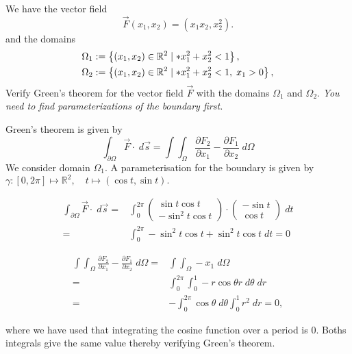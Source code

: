 \documentclass[11pt]{article}
\begin{document}
\begin{exercise}
    We have the vector field 
    \[
        \vec F( x_1, x_2 ) = \left( x_1 x_2, x_2^{2} \right).
    \]
    and the domains 
    \begin{align*}
        \Omega_1 &:= \left\{ (x_1,x_2) \in \bbR^{2} \suchthat* x_1^{2} + x_2^{2} < 1 \right\},
        \\
        \Omega_2 &:= \left\{ (x_1,x_2) \in \bbR^{2} \suchthat* x_1^{2} + x_2^{2} < 1, \; x_1 > 0 \right\},
     \end{align*}
    Verify Green's theorem for the vector field $\vec F$ with the domains $\Omega_1$ and $\Omega_2$. 
    \textit{You need to find parameterizations of the boundary first.}
\end{exercise}
\begin{solution}   
   Green's theorem is given by $$\int_{\partial \Omega} \vec{F} \cdot \;d\vec{s} = \int \int_{\Omega} \frac{\partial F_2}{\partial x_1} - \frac{\partial F_1}{\partial x_2} \;d \Omega$$
We consider domain $\Omega_1$. A parameterisation for the boundary is given by $\gamma: [0,2\pi] \mapsto \mathbb{R}^2, \quad t\mapsto  (\cos t, \sin t).$

\begin{align*}
\int_{\partial \Omega} \vec{F} \cdot \;d\vec{s} =& \int_0^ {2\pi} \begin{pmatrix}\sin t \cos t\\ -\sin^2 t \cos t \end{pmatrix} \cdot \begin{pmatrix}-\sin t \\ \cos t \end{pmatrix} \; d t \\
=& \int_0^{2\pi} -\sin^2 t\cos t + \sin^ 2 t \cos t \;dt = 0
\end{align*}

\begin{align*}
\int \int_{\Omega} \frac{\partial F_2}{\partial x_1} - \frac{\partial F_1}{\partial x_2} \;d \Omega =& \int \int_{\Omega} -x_1 \; d\Omega\\
=& \int_0^ {2\pi} \int_0^1 -r\cos \theta r \;d\theta\;dr\\
=& -\int_0^ {2\pi} \cos \theta \;d \theta \int_0^1 r^ 2 \;d r = 0,
\end{align*}

where we have used that integrating the cosine function over a period is $0$. Boths integrals give the same value thereby verifying Green's theorem.\\


\end{solution}
\end{document}
